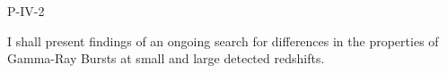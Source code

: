P-IV-2


\bigskip



\bigskip

\noindent I shall present findings of an ongoing search for differences in the properties of Gamma-Ray Bursts at small and large detected redshifts.
